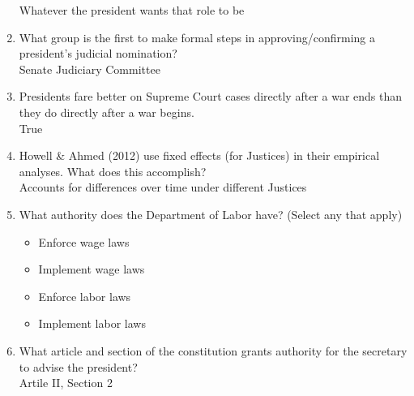 \documentclass{article}
\begin{document}
\begin{enumerate}
    \color{red} Whatever the president wants that role to be \color{black} 
    \item What group is the first to make formal steps in approving/confirming a president's judicial nomination? \\
    \color{red}  Senate Judiciary Committee\color{black} 
    \item Presidents fare better on Supreme Court cases directly after a war ends than they do directly after a war begins.\\
    \color{red}True \color{black}
    \item Howell \& Ahmed (2012) use fixed effects (for Justices) in their empirical analyses. What does this accomplish?\\
    \color{red} Accounts for differences over time under different Justices \color{black}
    \item What authority does the Department of Labor have? (Select any that apply)\color{red}
    \begin{itemize}
        \item  Enforce wage laws
        \item  Implement wage laws
        \item  Enforce labor laws
        \item  Implement labor laws
    \end{itemize}\color{black}
    \item What article and section of the constitution grants authority for the secretary to advise the president?\\
    \color{red}Artile II, Section 2 \color{black} 
\end{enumerate}
\end{document}
